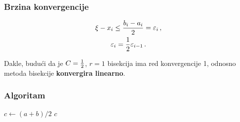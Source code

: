 \subsubsection{Brzina konvergencije}

\begin{gather*}
    \xi - x_i \leq \frac{b_i-a_i}{2} = \varepsilon_i\,,\\
    \varepsilon_i={1\over 2} \varepsilon_{i-1}\,.
\end{gather*}

Dakle, budući da je $C={1\over 2}$, $r=1$ bisekcija ima red konvergencije 1,
odnosno metoda bisekcije \textbf{konvergira linearno}.

\subsubsection{Algoritam}

\begin{algorithmic}
    \State $c \gets (a + b) / 2$
        \State \Return $c$
    \EndIf
        \State \Return {}
    \Else
        \State \Return {}
    \EndIf
\EndFunction
\end{algorithmic}
